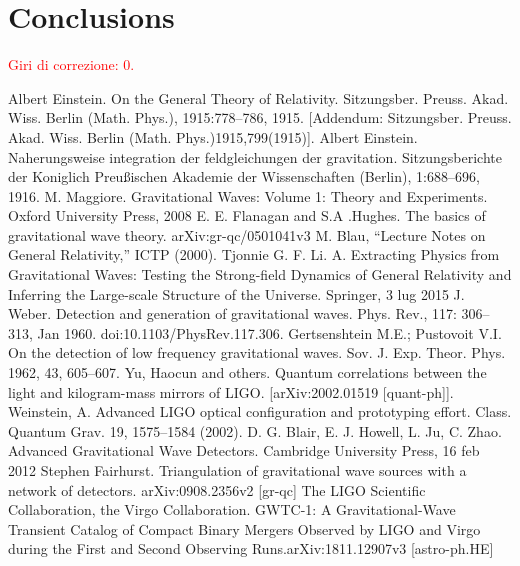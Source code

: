 \documentclass[binding=0.6cm, LaM]{sapthesis}
\newcommand{\fpg}[1]{\textcolor{red}{#1} }
\begin{document}
\chapter*{Conclusions}

\fpg{Giri di correzione: 0.}%

\backmatter
\cleardoublepage


\begin{thebibliography}{500}

	 Albert Einstein. On the General Theory of Relativity. Sitzungsber. Preuss. Akad. Wiss. Berlin (Math. Phys.), 1915:778–786, 1915. [Addendum: Sitzungsber. Preuss. Akad. Wiss. Berlin (Math. Phys.)1915,799(1915)]. 
	 Albert Einstein. Naherungsweise integration der feldgleichungen der gravitation. Sitzungsberichte der Koniglich Preu{\ss}ischen Akademie der Wissenschaften (Berlin), 1:688–696, 1916. 
	 M. Maggiore. Gravitational Waves: Volume 1: Theory and Experiments. Oxford University Press, 2008
	 E. E. Flanagan and S.A .Hughes. The basics of gravitational wave theory. arXiv:gr-qc/0501041v3
	 M. Blau, “Lecture Notes on General Relativity,” ICTP (2000). 
	 Tjonnie G. F. Li. A. Extracting Physics from Gravitational Waves: Testing the Strong-field Dynamics of General Relativity and Inferring the Large-scale Structure of the Universe. Springer, 3 lug 2015	
	 J. Weber. Detection and generation of gravitational waves. Phys. Rev., 117: 306–313, Jan 1960. doi:10.1103/PhysRev.117.306. 
	 Gertsenshtein M.E.; Pustovoit V.I. On the detection of low frequency gravitational waves. Sov. J. Exp. Theor. Phys. 1962, 43, 605–607. 
	 Yu, Haocun and others. Quantum correlations between the light and kilogram-mass mirrors of LIGO. [arXiv:2002.01519 [quant-ph]].
	 Weinstein, A. Advanced LIGO optical configuration and prototyping effort. Class. Quantum Grav. 19, 1575–1584 (2002).
	 D. G. Blair, E. J. Howell, L. Ju, C. Zhao. Advanced Gravitational Wave Detectors. Cambridge University Press, 16 feb 2012 
	 Stephen Fairhurst. Triangulation of gravitational wave sources with a network of detectors. arXiv:0908.2356v2 [gr-qc]
	 The LIGO Scientific Collaboration, the Virgo Collaboration. GWTC-1: A Gravitational-Wave Transient Catalog of Compact Binary Mergers Observed by LIGO and Virgo during the First and Second Observing Runs.arXiv:1811.12907v3 [astro-ph.HE]

\end{thebibliography}
\end{document}
